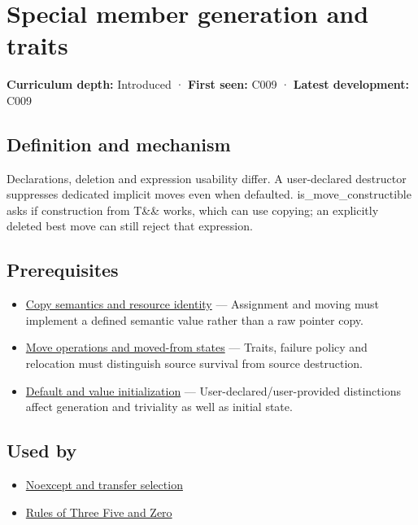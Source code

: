 \hypertarget{appendix-42e02a12c694}{}
\section{Special member generation and traits}\label{appendix-42e02a12c694-special-member-generation-and-traits}

\textbf{Curriculum depth:} Introduced · \textbf{First seen:} C009 · \textbf{Latest development:} C009

\subsection{Definition and mechanism}\label{appendix-42e02a12c694-definition-and-mechanism}

Declarations, deletion and expression usability differ. A user-declared destructor suppresses dedicated implicit moves even when defaulted. is\_move\_constructible asks if construction from T\&\& works, which can use copying; an explicitly deleted best move can still reject that expression.

\subsection{Prerequisites}\label{appendix-42e02a12c694-prerequisites}

\begin{itemize}
\tightlist
\item
  \hyperref[appendix-1340cd1ce582]{Copy semantics and resource identity} --- Assignment and moving must implement a defined semantic value rather than a raw pointer copy.
\item
  \hyperref[appendix-5636651017c2]{Move operations and moved-from states} --- Traits, failure policy and relocation must distinguish source survival from source destruction.
\item
  \hyperref[appendix-ba8c1a9fe03f]{Default and value initialization} --- User-declared/user-provided distinctions affect generation and triviality as well as initial state.
\end{itemize}

\subsection{Used by}\label{appendix-42e02a12c694-used-by}

\begin{itemize}
\tightlist
\item
  \hyperref[appendix-c746afaa47d1]{Noexcept and transfer selection}
\item
  \hyperref[appendix-7679107d057e]{Rules of Three Five and Zero}
\end{itemize}

